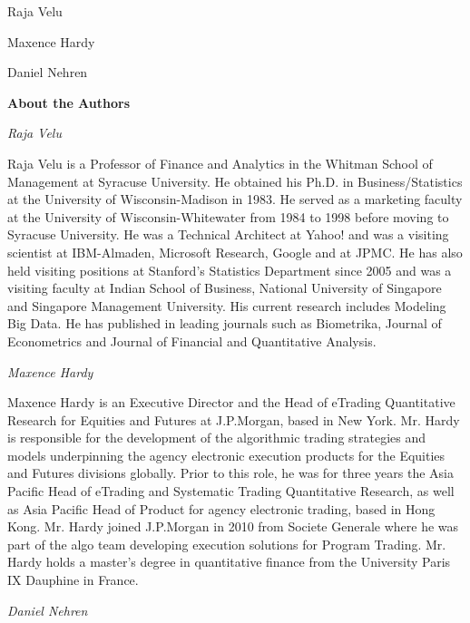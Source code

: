 \noindent Raja Velu \par
\noindent Maxence Hardy \par
\noindent Daniel Nehren



\newpage



{\noindent\Large\bfseries About the Authors} \vspace{1cm}


{\noindent\large\itshape Raja Velu} \medskip

\noindent Raja Velu is a Professor of Finance and Analytics in the Whitman School of Management at Syracuse University. He obtained his Ph.D. in Business/Statistics at the University of Wisconsin-Madison in 1983. He served as a marketing faculty at the University of Wisconsin-Whitewater from 1984 to 1998 before moving to Syracuse University. He was a Technical Architect at Yahoo! and was a visiting scientist at IBM-Almaden, Microsoft Research, Google and at JPMC. He has also held visiting positions at Stanford's Statistics Department since 2005 and was a visiting faculty at Indian School of Business, National University of Singapore and Singapore Management University. His current research includes Modeling Big Data. He has published in leading journals such as Biometrika, Journal of Econometrics and Journal of Financial and Quantitative Analysis. \bigskip


{\noindent\large\itshape Maxence Hardy} \medskip

\noindent Maxence Hardy is an Executive Director and the Head of eTrading Quantitative Research for Equities and Futures at J.P.Morgan, based in New York. Mr. Hardy is responsible for the development of the algorithmic trading strategies and models underpinning the agency electronic execution products for the Equities and Futures divisions globally. Prior to this role, he was for three years the Asia Pacific Head of eTrading and Systematic Trading Quantitative Research, as well as Asia Pacific Head of Product for agency electronic trading, based in Hong Kong. Mr. Hardy joined J.P.Morgan in 2010 from Societe Generale where he was part of the algo team developing execution solutions for Program Trading. Mr. Hardy holds a master's degree in quantitative finance from the University Paris IX Dauphine in France. \bigskip


{\noindent\large\itshape Daniel Nehren} \medskip

